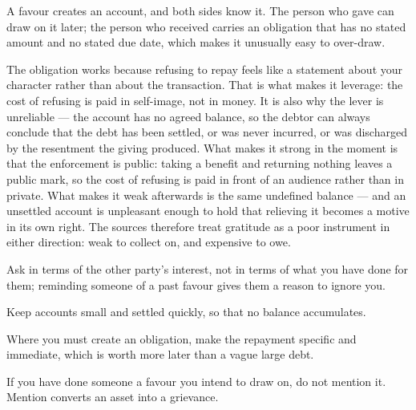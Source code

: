 


\begin{core}
A favour creates an account, and both sides know it. The person who gave can draw on it later; the person who received carries an obligation that has no stated amount and no stated due date, which makes it unusually easy to over-draw.
\end{core}

\begin{mechanism}
The obligation works because refusing to repay feels like a statement about your character rather than about the transaction. That is what makes it leverage: the cost of refusing is paid in self-image, not in money. It is also why the lever is unreliable --- the account has no agreed balance, so the debtor can always conclude that the debt has been settled, or was never incurred, or was discharged by the resentment the giving produced. What makes it strong in the moment is that the enforcement is public: taking a benefit and returning nothing leaves a public mark, so the cost of refusing is paid in front of an audience rather than in private. What makes it weak afterwards is the same undefined balance --- and an unsettled account is unpleasant enough to hold that relieving it becomes a motive in its own right. The sources therefore treat gratitude as a poor instrument in either direction: weak to collect on, and expensive to owe.
\end{mechanism}

\begin{application}
  \item Ask in terms of the other party's interest, not in terms of what you have done for them; reminding someone of a past favour gives them a reason to ignore you.
  \item Keep accounts small and settled quickly, so that no balance accumulates.
  \item Where you must create an obligation, make the repayment specific and immediate, which is worth more later than a vague large debt.
  \item If you have done someone a favour you intend to draw on, do not mention it. Mention converts an asset into a grievance.
\end{application}

